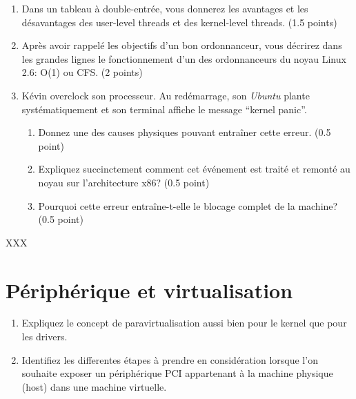 \begin{enumerate}
  \item
    Dans un tableau \`a double-entr\'ee, vous donnerez les avantages et
    les d\'esavantages des user-level threads et des kernel-level threads.
    (1.5 points)
  \item
    Apr\`es avoir rappel\'e les objectifs d'un bon ordonnanceur, vous
    d\'ecrirez dans les grandes lignes le fonctionnement d'un des
    ordonnanceurs du noyau Linux 2.6: O(1) ou CFS. (2 points)
  \item
    K\'evin overclock son processeur. Au red\'emarrage, son \textit{Ubuntu}
    plante syst\'ematiquement et son terminal affiche le message
    ``kernel panic''.

    \begin{enumerate}
      \item
        Donnez une des causes physiques pouvant entra\^iner cette erreur.
        (0.5 point)
      \item
        Expliquez succinctement comment cet \'ev\'enement est trait\'e et
        remont\'e au noyau sur l'architecture x86? (0.5 point)
      \item
        Pourquoi cette erreur entra\^ine-t-elle le blocage complet de
        la machine? (0.5 point)
    \end{enumerate}
\end{enumerate}

\begin{correction}

XXX

\end{correction}

%
%

\section{P\'eriph\'erique et virtualisation
         }

\begin{enumerate}
  \item
        Expliquez le concept de paravirtualisation aussi bien pour le kernel
        que pour les drivers.
  \item 
        Identifiez les differentes \'etapes \`a prendre en consid\'eration
        lorsque l'on souhaite exposer un p\'eriph\'erique PCI appartenant \`a la machine
        physique (host) dans une machine virtuelle.
\end{enumerate}

